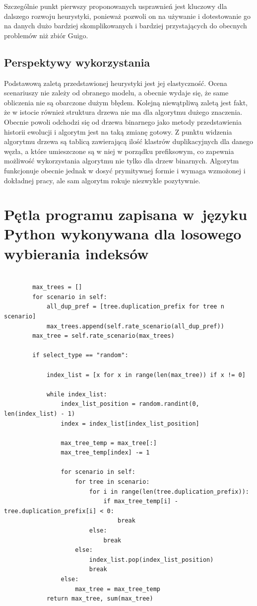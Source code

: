 \documentclass[licencjacka]{pracamgr}
\begin{document}
Szczególnie punkt pierwszy proponowanych usprawnień jest kluczowy dla dalszego rozwoju heurystyki, ponieważ pozwoli on na używanie i dotestowanie go na danych dużo bardziej skomplikowanych i bardziej przystających do obecnych problemów niż zbiór Guigo.

\section{Perspektywy wykorzystania}

Podstawową zaletą przedstawionej heurystyki jest jej elastyczność. Ocena scenariuszy nie zależy od obranego modelu, a obecnie wydaje się, że same obliczenia nie są obarczone dużym błędem. Kolejną niewątpliwą zaletą jest fakt, że w istocie również struktura drzewa nie ma dla algorytmu dużego znaczenia. Obecnie powoli odchodzi się od drzewa binarnego jako metody przedstawienia historii ewolucji i algorytm jest na taką zmianę gotowy. Z punktu widzenia algorytmu drzewa są tablicą zawierającą ilość klastrów duplikacyjnych dla danego węzła, a które umieszczone są w niej w porządku prefiksowym, co zapewnia możliwość wykorzystania algorytmu nie tylko dla drzew binarnych. Algorytm funkcjonuje obecnie jednak w dosyć prymitywnej formie i wymaga wzmożonej i dokładnej pracy, ale sam algorytm rokuje niezwykle pozytywnie.  

\appendix

\chapter{Pętla programu zapisana w~języku Python wykonywana dla losowego wybierania indeksów}

\begin{verbatim}

		max_trees = []
        for scenario in self:
            all_dup_pref = [tree.duplication_prefix for tree n scenario]
            max_trees.append(self.rate_scenario(all_dup_pref))
        max_tree = self.rate_scenario(max_trees)

        if select_type == "random":

            index_list = [x for x in range(len(max_tree)) if x != 0]

            while index_list:
                index_list_position = random.randint(0, len(index_list) - 1)
                index = index_list[index_list_position]

                max_tree_temp = max_tree[:]
                max_tree_temp[index] -= 1

                for scenario in self:
                    for tree in scenario:
                        for i in range(len(tree.duplication_prefix)):
                            if max_tree_temp[i] - tree.duplication_prefix[i] < 0:
                                break
                        else:
                            break
                    else:
                        index_list.pop(index_list_position)
                        break
                else:
                    max_tree = max_tree_temp
            return max_tree, sum(max_tree)
\end{verbatim}
\end{document}
